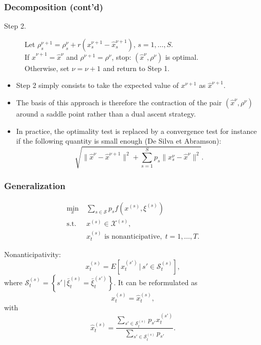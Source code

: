 \documentclass[french]{beamer}
\def\cS{\mathcal{S}}
\def\cX{\mathcal{X}}
\begin{document}
\begin{frame}
\frametitle{Decomposition (cont'd)}

\begin{description}
\item[Step 2.]
Let $\rho^{\nu+1}_s = \rho^{\nu}_s + r\left(x_s^{\nu+1}-\hat{x}_s
^{\nu+1}\right)$, $s = 1,\ldots{}, S$.\\
If $\hat{x}^{\nu+1} = \hat{x}^{\nu}$ and $\rho^{\nu+1} = \rho^{\nu}$,
stop: $(\hat{x}^{\nu}, \rho^{\nu})$ is optimal.\\
Otherwise, set $\nu = \nu+1$ and return to Step 1.
\end{description}

\mbox{}

\begin{itemize}
\item
Step 2 simply consists to take the expected value of $x^{\nu+1}$
as $\hat{x}^{\nu+1}$.
\item
The basis of this approach is therefore the contraction of the pair $(\hat{x}^{\nu}, \rho^{\nu})$ around a saddle point rather than a dual ascent strategy.
\item
In practice, the optimality test is replaced by a convergence test for instance if the following quantity is small enough (De Silva et Abramson):
\[
\sqrt{ \| \hat{x}^{\nu} - \hat{x}^{\nu+1} \|^2 + \sum_{s = 1}^S p_s \|
  x_s^{\nu} - \hat{x}^{\nu}\|^2}.
\]
\end{itemize}

\end{frame}

\begin{frame}
\frametitle{Generalization}

$$
\begin{aligned}
\min_{x}\; & \sum_{s \in \cS} p_s f\left(x^{(s)}, \xi^{(s)}\right)\\
\text{s.t. } & x^{(s)} \in \cX^{(s)},\\
& x_t^{(s)} \mbox{ is nonanticipative},\; t = 1, \dots, T.
\end{aligned}
$$

Nonanticipativity:
$$
x_t^{(s)} = E\left[ x_t^{(s')} \,\big|\, s' \in \cS_t^{(s)} \right],
$$
where $\cS_t^{(s)} = \left\{ s' \,\big|\, \bar{\xi}_t^{(s)} = \bar{\xi}_t^{(s') }\right\}$.
It can be reformulated as
\[
x_t^{(s)} = \hat{x}_t^{(s)},
\]
with
$$
\hat{x}_t^{(s)} = \frac{\sum_{s' \in \cS_{t}^{(s)}} p_{s'} x_t^{(s')}}{\sum_{s' \in \cS_t^{(s)}} p_{s'}}.
$$

\end{frame}
\end{document}

